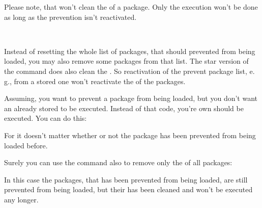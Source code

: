 Please note, that 
won't clean the  of a package. Only the execution won't be
done as long as the prevention isn't reactivated.%
%
%

\begin{Declaration}
  \\
\end{Declaration}
%
%
Instead of resetting the whole list of
packages, that should prevented from being loaded, you may also remove some
packages from that list. The star version of the command does also clean the
. So reactivation of the prevent package list, e.\,g.,
from a stored one won't reactivate the  of the packages.%
%
\begin{Example}
  Assuming, you want to prevent a package  from being loaded, but
  you don't want an already stored  to be
  executed. Instead of that code, you're own  should be
  executed. You can do this:
\begin{lstcode}
\end{lstcode}
  For  it doesn't matter whether or not
  the package has been prevented from being loaded before.

  Surely you can use the command also to remove only the 
  of all packages:
\begin{lstcode}
  \StorePreventPackageFromLoading\TheWholePreventList
  \UnPreventPackageFromLoading{\TheWholePreventList}
  \PreventPackageFromLoading{\TheWholePreventList}
\end{lstcode}
  In this case the packages, that has been prevented from being loaded, are
  still prevented from being loaded, but their  has been
  cleaned and won't be executed any longer.%
\end{Example}%
%
%
%

\endinput


